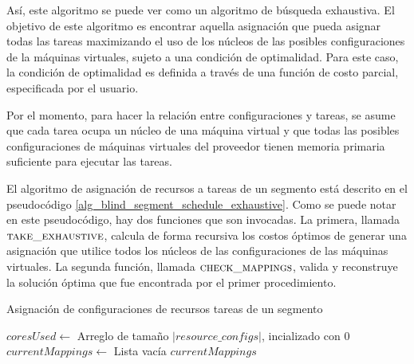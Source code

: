 
Así, este algoritmo se puede ver como un algoritmo de búsqueda exhaustiva. El objetivo de este algoritmo es encontrar aquella asignación que pueda asignar todas las tareas maximizando el uso de los núcleos de las posibles configuraciones de la máquinas virtuales, sujeto a una condición de optimalidad. Para este caso, la condición de optimalidad es definida a trav\'es de una funci\'on de costo parcial, especificada por el usuario. 

Por el momento, para hacer la relaci\'on entre configuraciones y tareas, se asume que cada tarea ocupa un núcleo de una máquina virtual y que todas las posibles configuraciones de máquinas virtuales del proveedor tienen memoria primaria suficiente para ejecutar las tareas.

El algoritmo de asignación de recursos a tareas de un segmento está descrito en el pseudocódigo \ref{alg_blind_segment_schedule_exhaustive}. Como se puede notar en este pseudocódigo, hay dos funciones que son invocadas. La primera, llamada $\Call{take\_exhaustive}{}$, calcula de forma recursiva los costos óptimos de generar una asignación que utilice todos los núcleos de las configuraciones de las máquinas virtuales. La segunda funci\'on, llamada $\Call{check\_mappings}{}$, valida y reconstruye la soluci\'on \'optima que fue encontrada por el primer procedimiento.

\begin{algorithm}
\caption{Asignación de configuraciones de recursos tareas de un segmento}
\label{alg_blind_segment_schedule_exhaustive}
\begin{algorithmic}[1]

	\State $coresUsed \gets$ Arreglo de tamaño $|resource\_configs|$, incializado con 0
	\State $currentMappings \gets$ Lista vacía	
	\State {}
	\State \Return $currentMappings$
\EndProcedure
\end{algorithmic}
\end{algorithm}



